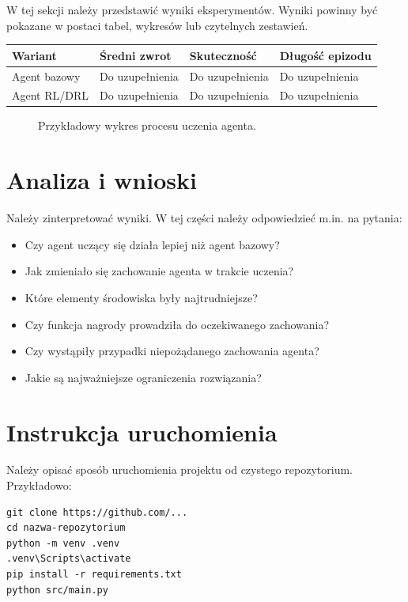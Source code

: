 \documentclass[12pt]{article}
\begin{document}
W tej sekcji należy przedstawić wyniki eksperymentów. Wyniki powinny być pokazane w postaci tabel, wykresów lub czytelnych zestawień.

\begin{center}
\begin{tabular}{p{}p{}p{}p{}}
\toprule
Wariant & Średni zwrot & Skuteczność & Długość epizodu \\
\midrule
Agent bazowy & Do uzupełnienia & Do uzupełnienia & Do uzupełnienia \\
Agent RL/DRL & Do uzupełnienia & Do uzupełnienia & Do uzupełnienia \\
\bottomrule
\end{tabular}
\end{center}

\begin{figure}[h]
    \centering
    \caption{Przykładowy wykres procesu uczenia agenta.}
\end{figure}

\section{Analiza i wnioski}

Należy zinterpretować wyniki. W tej części należy odpowiedzieć m.in. na pytania:
\begin{itemize}
    \item Czy agent uczący się działa lepiej niż agent bazowy?
    \item Jak zmieniało się zachowanie agenta w trakcie uczenia?
    \item Które elementy środowiska były najtrudniejsze?
    \item Czy funkcja nagrody prowadziła do oczekiwanego zachowania?
    \item Czy wystąpiły przypadki niepożądanego zachowania agenta?
    \item Jakie są najważniejsze ograniczenia rozwiązania?
\end{itemize}

\section{Instrukcja uruchomienia}

Należy opisać sposób uruchomienia projektu od czystego repozytorium. Przykładowo:

\begin{verbatim}
git clone https://github.com/...
cd nazwa-repozytorium
python -m venv .venv
.venv\Scripts\activate
pip install -r requirements.txt
python src/main.py
\end{verbatim}
\end{document}
